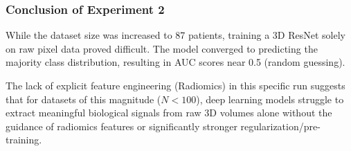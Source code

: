 \subsubsection{Conclusion of Experiment 2}
While the dataset size was increased to 87 patients, training a 3D ResNet solely on raw pixel data proved difficult. The model converged to predicting the majority class distribution, resulting in AUC scores near 0.5 (random guessing). 

The lack of explicit feature engineering (Radiomics) in this specific run suggests that for datasets of this magnitude ($N < 100$), deep learning models struggle to extract meaningful biological signals from raw 3D volumes alone without the guidance of radiomics features or significantly stronger regularization/pre-training.